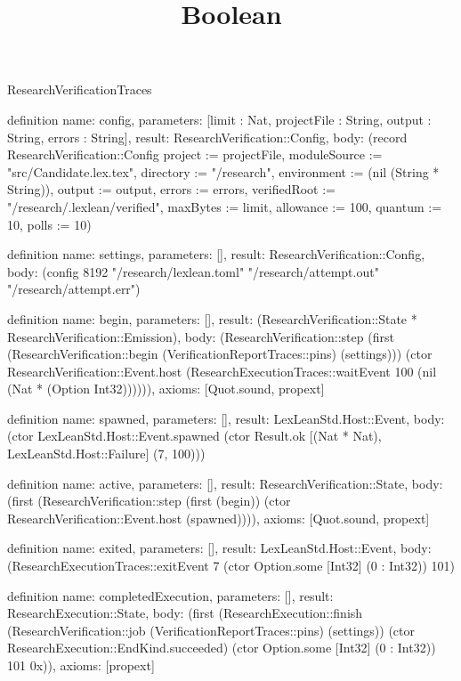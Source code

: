 \begin{lexlean}{ResearchVerificationTraces}
\title{Boolean}
\begin{semanticmodule}

definition{
  name: config,
  parameters: [limit : Nat, projectFile : String, output : String, errors : String],
  result: ResearchVerification::Config,
  body: (record ResearchVerification::Config {project := projectFile, moduleSource := "src/Candidate.lex.tex", directory := "/research", environment := (nil (String * String)), output := output, errors := errors, verifiedRoot := "/research/.lexlean/verified", maxBytes := limit, allowance := 100, quantum := 10, polls := 10})
}

definition{
  name: settings,
  parameters: [],
  result: ResearchVerification::Config,
  body: (config 8192 "/research/lexlean.toml" "/research/attempt.out" "/research/attempt.err")
}

definition{
  name: begin,
  parameters: [],
  result: (ResearchVerification::State * ResearchVerification::Emission),
  body: (ResearchVerification::step (first (ResearchVerification::begin (VerificationReportTraces::pins) (settings))) (ctor ResearchVerification::Event.host (ResearchExecutionTraces::waitEvent 100 (nil (Nat * (Option Int32)))))),
  axioms: [Quot.sound, propext]
}

definition{
  name: spawned,
  parameters: [],
  result: LexLeanStd.Host::Event,
  body: (ctor LexLeanStd.Host::Event.spawned (ctor Result.ok [(Nat * Nat), LexLeanStd.Host::Failure] (7, 100)))
}

definition{
  name: active,
  parameters: [],
  result: ResearchVerification::State,
  body: (first (ResearchVerification::step (first (begin)) (ctor ResearchVerification::Event.host (spawned)))),
  axioms: [Quot.sound, propext]
}

definition{
  name: exited,
  parameters: [],
  result: LexLeanStd.Host::Event,
  body: (ResearchExecutionTraces::exitEvent 7 (ctor Option.some [Int32] (0 : Int32)) 101)
}

definition{
  name: completedExecution,
  parameters: [],
  result: ResearchExecution::State,
  body: (first (ResearchExecution::finish (ResearchVerification::job (VerificationReportTraces::pins) (settings)) (ctor ResearchExecution::EndKind.succeeded) (ctor Option.some [Int32] (0 : Int32)) 101 0x)),
  axioms: [propext]
}


\end{semanticmodule}
\end{lexlean}
